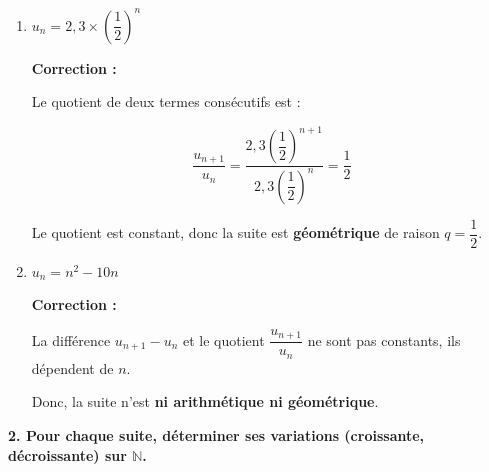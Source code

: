 \documentclass{article}
\begin{document}
\begin{enumerate}[label=\alph*)]
\[ u_{n+1} - u_n = [5 - \pi(n+1)] - [5 - \pi n] = -\pi \]

La différence est constante, donc la suite est \textbf{arithmétique} de raison \( r = -\pi \).

\bigskip

\item \( u_n = 2{,}3 \times \left( \dfrac{1}{2} \right)^n \)

\textbf{Correction :}

Le quotient de deux termes consécutifs est :

\[ \dfrac{u_{n+1}}{u_n} = \dfrac{2{,}3 \left( \dfrac{1}{2} \right)^{n+1}}{2{,}3 \left( \dfrac{1}{2} \right)^n} = \dfrac{1}{2} \]

Le quotient est constant, donc la suite est \textbf{géométrique} de raison \( q = \dfrac{1}{2} \).

\bigskip

\item \( u_n = n^2 - 10n \)

\textbf{Correction :}

La différence \( u_{n+1} - u_n \) et le quotient \( \dfrac{u_{n+1}}{u_n} \) ne sont pas constants, ils dépendent de \( n \).

Donc, la suite n'est \textbf{ni arithmétique ni géométrique}.

\end{enumerate}

\bigskip

\textbf{2. Pour chaque suite, déterminer ses variations (croissante, décroissante) sur \( \mathbb{N} \).}
\end{document}
